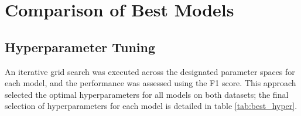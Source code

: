 \documentclass[a4paper,11pt]{report}
\begin{document}

\section{Comparison of Best Models}
\label{sec:Comparison of Best Models}

\subsection{Hyperparameter Tuning}

An iterative grid search was executed across the designated parameter spaces for each model, and the performance was assessed using the F1 score. This approach selected the optimal hyperparameters for all models on both datasets; the final selection of hyperparameters for each model is detailed in table  \ref{tab:best_hyper}.
\end{document}
